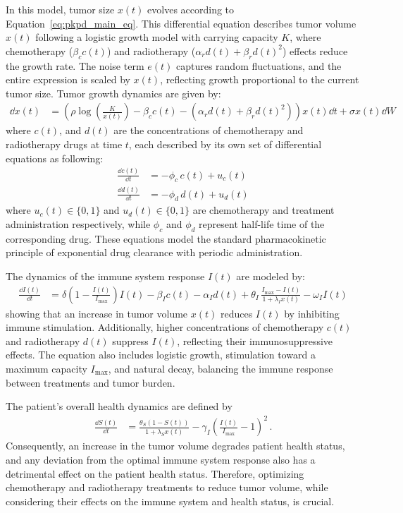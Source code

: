 \documentclass[preprint,12pt]{elsarticle}
\begin{document}
In this model, tumor size $x(t)$ evolves according to Equation~\eqref{eq:pkpd_main_eq}. This differential equation describes tumor volume $x(t)$ following a logistic growth model with carrying capacity $K$, where chemotherapy ($\beta_cc(t)$) and radiotherapy ($\alpha_rd(t)+\beta_rd(t)^2$) effects reduce the growth rate. The noise term $e(t)$ captures random fluctuations, and the entire expression is scaled by $x(t)$, reflecting growth proportional to the current tumor size.
Tumor growth dynamics are given by:
\begin{align}
\dd x(t) &= \left( \rho \log \left(\frac{K}{x(t)} \right) - \beta_c c(t) - (\alpha_r d(t) + \beta_r d(t)^2)  \right) x(t) \dd t + \sigma x(t) \dd W
\label{eq:pkpd_main_eq}
\end{align}
where $c(t)$, and $d(t)$ are the concentrations of chemotherapy and radiotherapy drugs at time $t$,  each described by its own set of differential equations as following: 
\begin{align}
\frac{\dd c(t)}{\dd t} &= -\phi_c \, c(t) + u_c(t) 
\label{eq:chemo_eq} \\
\frac{\dd d(t)}{\dd t} &= -\phi_d \, d(t) + u_d(t)
\label{eq:radio_eq}
\end{align}
where $u_c(t) \in \{0,1\}$ and $u_d(t)\in \{0,1\}$ are chemotherapy and treatment administration respectively, while $\phi_c$ and $\phi_d$ represent half-life time of the corresponding drug. These equations model the standard pharmacokinetic principle of exponential drug clearance with periodic administration.

The dynamics of the immune system response \( I(t) \) are modeled by:
\begin{align}
\frac{\dd I(t)}{\dd t} &= \delta \left(1 - \frac{I(t)}{I_{\text{max}}}\right) I(t) - \beta_I c(t) - \alpha_I d(t) + 
\theta_I \, \frac{I_{\text{max}} - I(t)}{1 + \lambda_I x(t)} - \omega_I I(t) 
\label{eq:immune_eq}
\end{align}
showing that an increase in tumor volume \( x(t) \) reduces \( I(t) \) by inhibiting immune stimulation. Additionally, higher concentrations of chemotherapy \( c(t) \) and radiotherapy \( d(t) \) suppress \( I(t) \), reflecting their immunosuppressive effects. The equation also includes logistic growth, stimulation toward a maximum capacity \( I_{\text{max}} \), and natural decay, balancing the immune response between treatments and tumor burden.
 
The patient's overall health dynamics are defined by
\begin{align}
\frac{\dd S(t)}{\dd t} &= \frac{\theta_S (1 - S(t))}{1 + \lambda_S x(t)} - \gamma_I \left(\frac{I(t)}{I_{\text{max}}} - 1\right)^2 \,.
\label{eq:health_eq}
\end{align} 
Consequently, an increase in the tumor volume degrades patient health status, and any deviation from the optimal immune system response also has a detrimental effect on the patient health status. Therefore, optimizing chemotherapy and radiotherapy treatments to reduce tumor volume, while considering their effects on the immune system and health status, is crucial.
\end{document}
